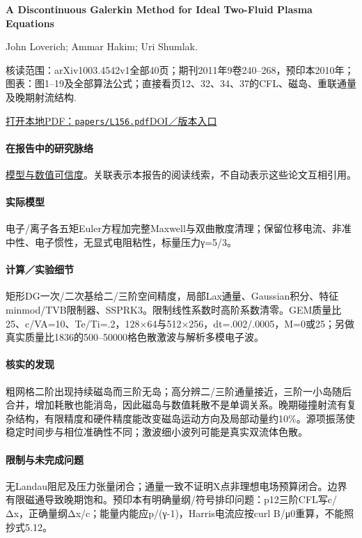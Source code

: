 \documentclass[UTF8,a4paper,11pt,openany,fontset=fandol]{ctexbook}
\begin{document}
\textbf{A Discontinuous Galerkin Method for Ideal Two-Fluid Plasma Equations}\citep{L156}\

John Loverich;  Ammar Hakim;  Uri Shumlak.

\textsf{核读范围：}arXiv1003.4542v1全部40页；期刊2011年9卷240–268，预印本2010年；\textsf{图表：}图1–19及全部算法公式；直接看页12、32、34、37的CFL、磁岛、重联通量及晚期射流结构.

\href{run:../papers/L156.pdf}{打开本地PDF：\texttt{papers/L156.pdf}}\quad\href{https://doi.org/10.4208/cicp.250509.210610a}{DOI／版本入口}

\paragraph{在报告中的研究脉络}\hyperref[V1-ch:numerics]{模型与数值可信度}。关联表示本报告的阅读线索，不自动表示这些论文互相引用。

\paragraph{实际模型}电子/离子各五矩Euler方程加完整Maxwell与双曲散度清理；保留位移电流、非准中性、电子惯性，无显式电阻粘性，标量压力γ=5/3。

\paragraph{计算／实验细节}矩形DG一次/二次基给二/三阶空间精度，局部Lax通量、Gaussian积分、特征minmod/TVB限制器、SSPRK3。限制线性系数时高阶系数清零。GEM质量比25、c/VA=10、Te/Ti=.2，128×64与512×256，dt=.002/.0005，M=0或25；另做真实质量比1836的500–50000格色散激波与解析多模电子波。

\paragraph{核实的发现}粗网格二阶出现持续磁岛而三阶无岛；高分辨二/三阶通量接近，三阶一小岛随后合并，增加耗散也能消岛，因此磁岛与数值耗散不是单调关系。晚期碰撞射流有复杂结构，有限精度和硬件精度能改变磁岛运动方向及局部动量约10\%。源项振荡使稳定时间步与相位准确性不同；激波细小波列可能是真实双流体色散。

\paragraph{限制与未完成问题}无Landau阻尼及压力张量闭合；通量一致不证明X点非理想电场预算闭合。边界有限磁通导致晚期饱和。预印本有明确量纲/符号排印问题：p12三阶CFL写c/Δx，正确量纲Δx/c；能量内能应p/(γ-1)，Harris电流应按curl B/μ0重算，不能照抄式5.12。
\end{document}
